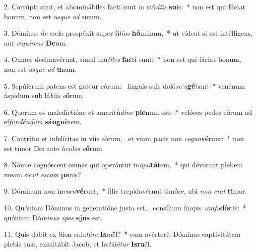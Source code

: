2. Corrúpti sunt, et abominábiles facti sunt in stú\textit{di}\textit{is} \textbf{su}is:~*  non est qui fáciat bonum, non est \textit{us}\textit{que} \textit{ad} \textbf{u}num.\

3. Dóminus de cælo prospéxit super fí\textit{li}\textit{os} \textbf{hó}minum,~*  ut vídeat si est intélligens, aut \textit{re}\textit{quí}\textit{rens} \textbf{De}um.\

4. Omnes declinavérunt, simul inú\textit{ti}\textit{les} \textbf{fac}ti sunt:~*  non est qui fáciat bonum, non est \textit{us}\textit{que} \textit{ad} \textbf{u}num.\

5. Sepúlcrum patens est guttur eórum: \dag\  linguis suis doló\textit{se} \textit{a}\textbf{gé}bant~*  venénum áspidum sub lá\textit{bi}\textit{is} \textit{e}\textbf{ó}rum.\

6. Quorum os maledictióne et amaritú\textit{di}\textit{ne} \textbf{ple}num est:~*  velóces pedes eórum ad ef\textit{fun}\textit{dén}\textit{dum} \textbf{sán}\textbf{gui}nem.\

7. Contrítio et infelícitas in viis eórum, \dag\  et viam pacis non \textit{co}\textit{gno}\textbf{vé}runt:~*  non est timor Dei ante ó\textit{cu}\textit{los} \textit{e}\textbf{ó}rum.\

8. Nonne cognóscent omnes qui operántur in\textit{i}\textit{qui}\textbf{tá}tem,~*  qui dévorant plebem meam sic\textit{ut} \textit{es}\textit{cam} \textbf{pa}nis?\

9. Dóminum non in\textit{vo}\textit{ca}\textbf{vé}runt,~*  illic trepidavérunt timóre, ubi \textit{non} \textit{e}\textit{rat} \textbf{ti}mor.\

10. Quóniam Dóminus in generatióne justa est, \dag\  consílium ínopis \textit{con}\textit{fu}\textbf{dís}tis:~*  quóniam Dó\textit{mi}\textit{nus} \textit{spes} \textbf{e}\textbf{jus} est.\

11. Quis dabit ex Sion salu\textit{tá}\textit{re} \textbf{Is}raël?~*  cum avérterit Dóminus captivitátem plebis suæ, exsultábit Jacob, et læ\textit{tá}\textit{bi}\textit{tur} \textbf{Is}\textbf{ra}ël.\

